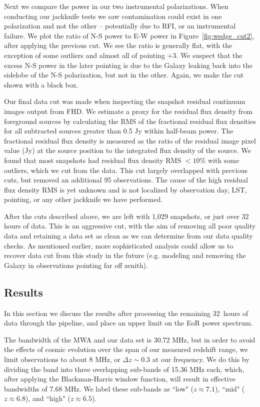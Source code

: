 \documentclass[iop]{emulateapj}
\begin{document}
Next we compare the power in our two instrumental polarizations. When conducting our 
jackknife tests we saw contamination could exist in one polarization and not the other -- 
potentially due to RFI, or an instrumental failure. We plot the ratio of N-S power to E-W 
power in Figure~\ref{fig:wedge_cut2}, after applying the previous cut. We see the ratio is 
generally flat, with the exception of some outliers and almost all of pointing $+3$. We 
suspect that the excess N-S power in the later pointing is due to the Galaxy leaking back 
into the sidelobe of the N-S polarization, but not in the other. Again, we make the cut shown 
with a black box.

Our final data cut was made when inspecting the snapshot residual continuum images output from 
FHD. 
We estimate a proxy for the residual flux density from foreground sources by calculating
the RMS of the fractional residual flux densities for all subtracted sources greater than
0.5 Jy within half-beam power. The fractional residual flux density is measured as the ratio
of the residual image pixel value (Jy) at the source position to the integrated flux density
of the source.
We found
that most snapshots had residual flux density RMS $<10\%$ with some outliers,
which we cut from the data. This cut largely overlapped with previous cuts, but removed an 
additional 95 observations. The cause of the high residual flux density RMS is yet unknown and is 
not localized by observation day, LST, pointing, or any other jackknife we have performed.

After the cuts described above, we are left with 1,029 snapshots, or just over 32 hours of 
data. This is an aggressive cut, with the aim of removing all poor quality data and retaining 
a data set as clean as we can determine from our data quality checks. As mentioned earlier, more sophisticated analysis could allow us to 
recover data cut from this study in the future (e.g. modeling and removing the Galaxy in 
observations pointing far off zenith).

\subsection{Results}\label{sec:results}

In this section we discuss the results after processing the remaining 32~hours of data 
through the \eppsilon pipeline, and place an upper limit on the EoR power spectrum.

The bandwidth of the MWA and our data set is 30.72 MHz, but in order to avoid the effects 
of cosmic evolution over the span of our measured redshift range, we limit observations to 
about 8 MHz, or $\Delta z \sim 0.3$ at our frequency. We do this by dividing the band into 
three overlapping sub-bands of 15.36 MHz each, which, after applying the Blackman-Harris 
window function, will result in effective bandwidths of 7.68 MHz. We label these sub-bands 
as ``low" ($z\approx 7.1$), ``mid" ($z\approx 6.8$), and ``high" ($z\approx 6.5$).
\end{document}
